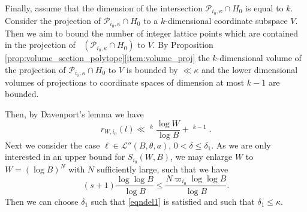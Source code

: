 \documentclass[JEP,XML,SOM,Unicode,published]{cedram}
\DeclareMathOperator{\LBt}{\mathit{L(B,\theta)}}
\newcommand{\cLBta}{\calL''(B,\theta,a)}
\let\del\delta
\newcommand{\calL}{\mathcal{L}}
\theoremstyle{definition}
\numberwithin{theorem}{section}
\begin{document}
Finally, assume that the dimension of the intersection $\mathcal{P}_{i_0,\kappa}\cap H_0$ is equal to $k$. Consider the projection of $\mathcal{P}_{i_0,\kappa}\cap H_0$ to a $k$-dimensional coordinate subspace $V$. Then we aim to bound the number of integer lattice points which are contained in the projection of $\LBt(\mathcal{P}_{i_0,\kappa}\cap H_0)$ to $V$. By Proposition \ref{prop:volume_section_polytope}\eqref{item:volume_proj} the $k$-dimensional volume of the projection of $\mathcal{P}_{i_0,\kappa}\cap H_0$ to $V$ is bounded by $\ll \kappa$ and the lower dimensional volumes of projections to coordinate spaces of dimension at most $k-1$ are bounded.

Then, by Davenport's lemma \cite{davenport} we have
\[
r_{W,i_0}(l)\ll \LBt^{k} \frac{\log W}{\log B} + \LBt^{k-1}.
\]
Next we consider the case $\ell\in\cLBta$, \ie $0<\del\leq \del_1$. As we are only interested in an upper bound for $S_{i_0}(W,B)$, we may enlarge $W$ to $W=(\log B)^N$ with $N$ sufficiently large, such that we have
\[
(s+1)\frac{\log\log B}{\log B} \leq \frac{ N \varpi_{i_0} \log \log B}{\log B}.
\]
Then we can choose $\del_1$ such that \eqref{eqndel1} is satisfied and such that $\del_1\leq \kappa$.
\end{document}
